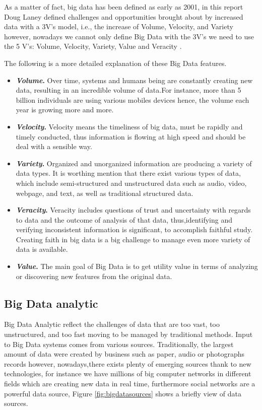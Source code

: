 As a matter of fact, big data has been defined as early as 2001, in this report \cite{laney20013d} Doug Laney defined challenges and opportunities brought about by increased data with a 3V's model, i.e., the increase of Volume, Velocity, and Variety however, nowadays we cannot only define Big Data with the 3V's we need to use the 5 V's: Volume, Velocity, Variety, Value and Veracity \cite{zakir2015big}.

The following is a more detailed explanation of these Big Data features.

\begin{itemize}
\item \textbf{\textit{Volume}.} Over time, systems and humans being are constantly creating new data, resulting in an incredible volume of data.For instance, more than 5 billion individuals are using various mobiles devices \cite{khan2014big} hence, the volume each year is growing more and more.
\item \textbf{\textit{Velocity}.} Velocity means the timeliness of big data, must be rapidly and timely conducted, thus information is flowing at high speed and should be deal with a sensible way.
\item \textbf{\textit{Variety}.} Organized and unorganized information are producing a variety of data types. It is worthing mention that there exist various types of data, which include semi-structured and unstructured data such as audio, video, webpage, and text, as well as traditional structured data.
\item \textbf{\textit{Veracity}.} Veracity includes questions of trust and uncertainty with regards to data and the outcome of analysis of that data, thus,identifying and verifying inconsistent information is significant, to accomplish faithful study. Creating faith in big data is a big challenge to manage even more variety of data is available.
\item \textbf{\textit{Value}.} The main goal of Big Data is to get utility value in terms of analyzing or discovering new features from the original data. 
\end{itemize}

\subsection{Big Data analytic}
Big Data Analytic reflect the challenges of data that are too vast, too unstructured, and too fast moving to be managed by traditional methods. Input to Big Data systems comes from various sources. Traditionally, the largest amount of data were created by business such as paper, audio or photographs records however, nowadays,there exists plenty of emerging sources thank to new technologies, for instance we have millions of big computer networks in different fields which are creating new data in real time, furthermore social networks are a powerful data source, Figure \ref{fig:bigdatasources} shows a briefly view of data sources. 


